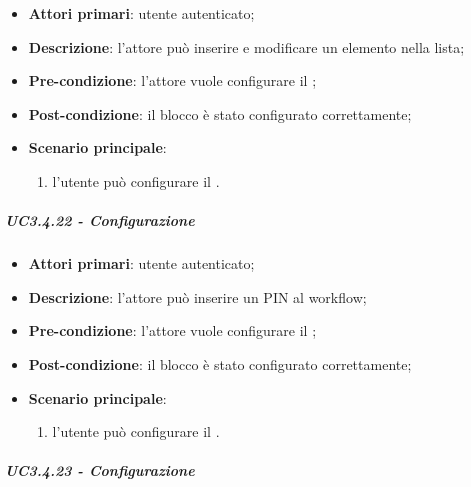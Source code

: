 \begin{itemize}
\item \textbf{Attori primari}: utente autenticato;

\item \textbf{Descrizione}: l'attore può inserire e modificare un elemento nella lista;

\item \textbf{Pre-condizione}: l'attore vuole configurare il \BLista{};

\item \textbf{Post-condizione}:  il blocco è stato configurato correttamente;

\item \textbf{Scenario principale}:
\begin{enumerate}
\item  l'utente può configurare il \BLista{}.

\end{enumerate}
\end{itemize}

\subparagraph{UC3.4.22 - Configurazione \BSicurezza{}}

\begin{itemize}
\item \textbf{Attori primari}: utente autenticato;

\item \textbf{Descrizione}: l'attore può inserire un PIN al workflow;

\item \textbf{Pre-condizione}: l'attore vuole configurare il \BSicurezza{};

\item \textbf{Post-condizione}:  il blocco è stato configurato correttamente;

\item \textbf{Scenario principale}:
\begin{enumerate}
\item  l'utente può configurare il \BSicurezza{}.

\end{enumerate}
\end{itemize}

\subparagraph{UC3.4.23 - Configurazione \BKindle{}}

